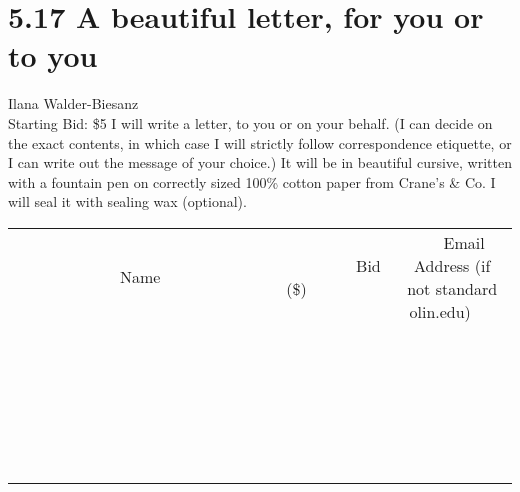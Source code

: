 \documentclass[11pt]{article}
\begin{document}
\section*{5.17 A beautiful letter, for you or to you}
Ilana Walder-Biesanz
\\
Starting Bid: \$5
\newline
I will write a letter, to you or on your behalf. (I can decide on the exact contents, in which case I will strictly follow correspondence etiquette, or I can write out the message of your choice.) It will be in beautiful cursive, written with a fountain pen on correctly sized 100\% cotton paper from Crane's \& Co. I will seal it with sealing wax (optional).
\\[6ex]
\begin{tabular}{c c c}
~~~~~~~~~~~~~Name~~~~~~~~~~~~~ & ~~~~~~~~~Bid (\$)~~~~~~~~~  & ~~~Email Address (if not standard olin.edu)~~~\\
 & & \\
\hline
 & & \\
\hline
 & & \\
\hline
 & & \\
\hline
 & & \\
\hline
 & & \\
\hline
 & & \\
\hline
 & & \\
\hline
 & & \\
\hline
 & & \\
\hline
 & & \\
\hline
 & & \\
\hline
 & & \\
\hline
 & & \\
\hline
 & & \\
\hline
 & & \\
\hline
 & & \\
\hline
 & & \\
\hline
 & & \\
\hline
 & & \\
\hline
 & & \\
\hline
 & & \\
\hline
 & & \\
\hline
 & & \\
\hline
 & & \\
\hline
 & & \\
\hline
\end{tabular}
\newpage
\end{document}
